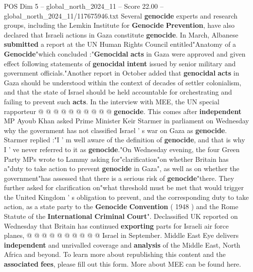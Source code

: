 \begin{textsample}{POS Dim 5 – global\_north\_2024\_11 – Score 22.00 – global\_north\_2024\_11/117675946.txt}
Several \textbf{genocide} experts and research groups, including the Lemkin Institute for \textbf{Genocide} \textbf{Prevention}, have also declared that Israeli actions in Gaza constitute \textbf{genocide}.
In March, Albanese \textbf{submitted} a report at the UN Human Rights Council entitled"Anatomy of a \textbf{Genocide}"which concluded :"\textbf{Genocidal} \textbf{acts} in Gaza were approved and given effect following statements of \textbf{genocidal} \textbf{intent} issued by senior military and government officials."Another report in October added that \textbf{genocidal} \textbf{acts} in Gaza should be understood within the context of decades of settler colonialism, and that the state of Israel should be held accountable for orchestrating and failing to prevent such \textbf{acts}.
In the interview with MEE, the UN special rapporteur @ @ @ @ @ @ @ @ @ @ \textbf{genocide}.
This comes after \textbf{independent} MP Ayoub Khan asked Prime Minister Keir Starmer in parliament on Wednesday why the government has not classified Israel ' s war on Gaza as \textbf{genocide}.
Starmer replied :"I ' m well aware of the definition of \textbf{genocide}, and that is why I ' ve never referred to it as \textbf{genocide}."On Wednesday evening, the four Green Party MPs wrote to Lammy asking for"clarification"on whether Britain has a"duty to take action to prevent \textbf{genocide} in Gaza", as well as on whether the government"has assessed that there is a serious risk of \textbf{genocide}"there.
They further asked for clarification on"what threshold must be met that would trigger the United Kingdom ' s obligation to prevent, and the corresponding duty to take action, as a state party to the \textbf{Genocide} \textbf{Convention} ( 1948 ) and the Rome Statute of the \textbf{International} \textbf{Criminal} \textbf{Court}".
Declassified UK reported on Wednesday that Britain has continued \textbf{exporting} parts for Israeli air force planes, @ @ @ @ @ @ @ @ @ @ Israel in September.
Middle East Eye delivers \textbf{independent} and unrivalled coverage and \textbf{analysis} of the Middle East, North Africa and beyond.
To learn more about republishing this content and the \textbf{associated} \textbf{fees}, please fill out this form.
More about MEE can be found here.

\end{textsample}
